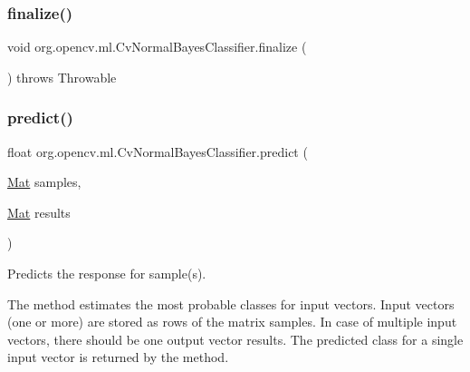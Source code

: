 \mbox{\label{classorg_1_1opencv_1_1ml_1_1_cv_normal_bayes_classifier_a14105f5cb61fa92b6b3990690b16f247}} 
\subsubsection{\texorpdfstring{finalize()}{finalize()}}
{\footnotesize\ttfamily void org.\+opencv.\+ml.\+Cv\+Normal\+Bayes\+Classifier.\+finalize (\begin{DoxyParamCaption}{ }\end{DoxyParamCaption}) throws Throwable\hspace{0.3cm}{\ttfamily [protected]}}

\mbox{\label{classorg_1_1opencv_1_1ml_1_1_cv_normal_bayes_classifier_a58960674387d3a7a1ea0b0cb544ab269}} 
\subsubsection{\texorpdfstring{predict()}{predict()}\hspace{0.1cm}{\footnotesize\ttfamily [1/2]}}
{\footnotesize\ttfamily float org.\+opencv.\+ml.\+Cv\+Normal\+Bayes\+Classifier.\+predict (\begin{DoxyParamCaption}\item[{\mbox{\hyperlink{classorg_1_1opencv_1_1core_1_1_mat}{Mat}}}]{samples,  }\item[{\mbox{\hyperlink{classorg_1_1opencv_1_1core_1_1_mat}{Mat}}}]{results }\end{DoxyParamCaption})}

Predicts the response for sample(s).

The method estimates the most probable classes for input vectors. Input vectors (one or more) are stored as rows of the matrix {\ttfamily samples}. In case of multiple input vectors, there should be one output vector {\ttfamily results}. The predicted class for a single input vector is returned by the method.

